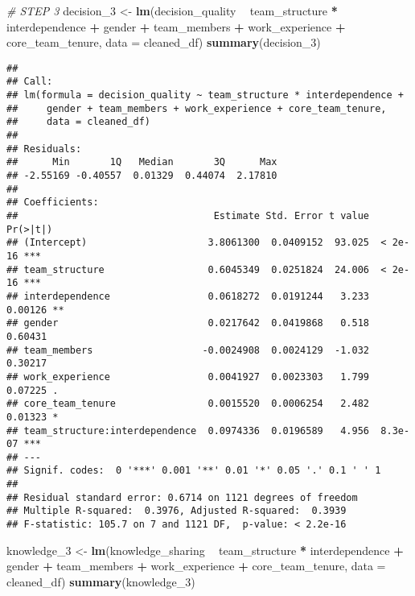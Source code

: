 \documentclass[]{article}
\newenvironment{Shaded}{\begin{snugshade}}{\end{snugshade}}
\newcommand{\CommentTok}[1]{\textcolor[rgb]{0.56,0.35,0.01}{\textit{#1}}}
\newcommand{\DataTypeTok}[1]{\textcolor[rgb]{0.13,0.29,0.53}{#1}}
\newcommand{\DecValTok}[1]{\textcolor[rgb]{0.00,0.00,0.81}{#1}}
\newcommand{\KeywordTok}[1]{\textcolor[rgb]{0.13,0.29,0.53}{\textbf{#1}}}
\newcommand{\NormalTok}[1]{#1}
\newcommand{\OperatorTok}[1]{\textcolor[rgb]{0.81,0.36,0.00}{\textbf{#1}}}
\newcommand{\StringTok}[1]{\textcolor[rgb]{0.31,0.60,0.02}{#1}}
\begin{document}
\begin{Shaded}
\begin{Highlighting}[]
\CommentTok{# STEP 3}
\NormalTok{decision_}\DecValTok{3}\NormalTok{ <-}\StringTok{ }\KeywordTok{lm}\NormalTok{(decision_quality }\OperatorTok{~}\StringTok{ }\NormalTok{team_structure }\OperatorTok{*}\StringTok{ }\NormalTok{interdependence }\OperatorTok{+}\StringTok{ }\NormalTok{gender }\OperatorTok{+}\StringTok{ }\NormalTok{team_members }\OperatorTok{+}\StringTok{ }\NormalTok{work_experience }\OperatorTok{+}\StringTok{ }\NormalTok{core_team_tenure, }\DataTypeTok{data =}\NormalTok{ cleaned_df)}
\KeywordTok{summary}\NormalTok{(decision_}\DecValTok{3}\NormalTok{)}
\end{Highlighting}
\end{Shaded}

\begin{verbatim}
## 
## Call:
## lm(formula = decision_quality ~ team_structure * interdependence + 
##     gender + team_members + work_experience + core_team_tenure, 
##     data = cleaned_df)
## 
## Residuals:
##      Min       1Q   Median       3Q      Max 
## -2.55169 -0.40557  0.01329  0.44074  2.17810 
## 
## Coefficients:
##                                  Estimate Std. Error t value Pr(>|t|)    
## (Intercept)                     3.8061300  0.0409152  93.025  < 2e-16 ***
## team_structure                  0.6045349  0.0251824  24.006  < 2e-16 ***
## interdependence                 0.0618272  0.0191244   3.233  0.00126 ** 
## gender                          0.0217642  0.0419868   0.518  0.60431    
## team_members                   -0.0024908  0.0024129  -1.032  0.30217    
## work_experience                 0.0041927  0.0023303   1.799  0.07225 .  
## core_team_tenure                0.0015520  0.0006254   2.482  0.01323 *  
## team_structure:interdependence  0.0974336  0.0196589   4.956  8.3e-07 ***
## ---
## Signif. codes:  0 '***' 0.001 '**' 0.01 '*' 0.05 '.' 0.1 ' ' 1
## 
## Residual standard error: 0.6714 on 1121 degrees of freedom
## Multiple R-squared:  0.3976, Adjusted R-squared:  0.3939 
## F-statistic: 105.7 on 7 and 1121 DF,  p-value: < 2.2e-16
\end{verbatim}

\begin{Shaded}
\begin{Highlighting}[]
\NormalTok{knowledge_}\DecValTok{3}\NormalTok{ <-}\StringTok{ }\KeywordTok{lm}\NormalTok{(knowledge_sharing }\OperatorTok{~}\StringTok{ }\NormalTok{team_structure }\OperatorTok{*}\StringTok{ }\NormalTok{interdependence }\OperatorTok{+}\StringTok{ }\NormalTok{gender }\OperatorTok{+}\StringTok{ }\NormalTok{team_members }\OperatorTok{+}\StringTok{ }\NormalTok{work_experience }\OperatorTok{+}\StringTok{ }\NormalTok{core_team_tenure, }\DataTypeTok{data =}\NormalTok{ cleaned_df)}
\KeywordTok{summary}\NormalTok{(knowledge_}\DecValTok{3}\NormalTok{)}
\end{Highlighting}
\end{Shaded}
\end{document}
